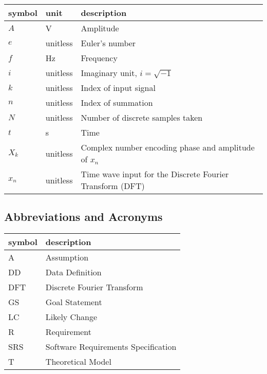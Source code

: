 \documentclass[12pt]{article}
\newcommand{\euler}{e}
\newcommand{\complex}{i}
\begin{document}
\renewcommand{\arraystretch}{1.2}
\noindent \begin{longtable*}{l l p{12cm}} \toprule
  \textbf{symbol} & \textbf{unit} & \textbf{description}\\
  \midrule 
    $A$		& \si{\volt}					  & Amplitude\\
  $\euler$	& \si[per-mode=symbol] {unitless} & Euler's number \\
	$f$		&	Hz							  & Frequency\\
  $\complex$  & \si[per-mode=symbol] {unitless} & Imaginary unit, $\complex = 
\sqrt{-1}$\\
  $k$		&	unitless						& Index of input signal\\
  $n$		&	unitless						& Index of summation\\
  $N$			& unitless						  & Number of discrete samples taken\\
  $t$		&	\si{\second}					& Time\\
  $X_k$		& unitless						  & Complex number encoding phase and amplitude of 
$x_n$\\
  $x_n$		& unitless						  & Time wave input for the Discrete Fourier 
Transform 
(DFT)
  \\
  \bottomrule
\end{longtable*}

\subsection{Abbreviations and Acronyms}

\renewcommand{\arraystretch}{1.2}
\begin{tabular}{l l}
  \toprule		
  \textbf{symbol} & \textbf{description}\\
  \midrule 
  A & Assumption\\
  DD & Data Definition\\
  DFT & Discrete Fourier Transform\\
  GS & Goal Statement\\
  LC & Likely Change\\
  R & Requirement\\
  SRS & Software Requirements Specification\\
  T & Theoretical Model\\
  \bottomrule
\end{tabular}\\
\end{document}
